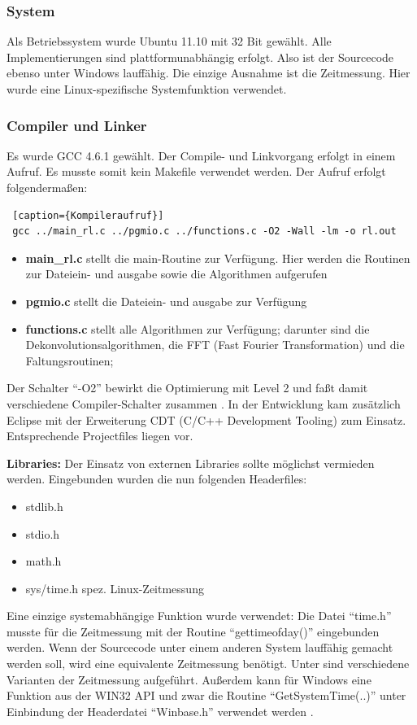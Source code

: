 \documentclass[a4paper,12pt]{article}
\begin{document}
\subsubsection{System}
Als Betriebssystem wurde Ubuntu 11.10 mit 32 Bit gewählt. Alle Implementierungen
sind plattformunabhängig erfolgt. Also ist der Sourcecode ebenso unter Windows
lauffähig. Die einzige Ausnahme ist die Zeitmessung. Hier wurde eine
Linux-spezifische Systemfunktion verwendet.
\subsubsection{Compiler und Linker}
Es wurde GCC 4.6.1 gewählt. Der Compile- und Linkvorgang erfolgt in einem
Aufruf. Es musste somit kein Makefile verwendet werden.
Der Aufruf erfolgt folgendermaßen:
\begin{lstlisting} [caption={Kompileraufruf}]
 gcc ../main_rl.c ../pgmio.c ../functions.c -O2 -Wall -lm -o rl.out
\end{lstlisting}
\begin{itemize}
  \itemsep -1pt  
\item \textbf{main\_rl.c} stellt die main-Routine zur Verfügung. Hier werden die
Routinen zur Dateiein- und ausgabe sowie die Algorithmen aufgerufen
\item \textbf{pgmio.c} stellt die Dateiein- und ausgabe zur Verfügung
\item \textbf{functions.c} stellt alle Algorithmen zur Verfügung; darunter sind
die Dekonvolutions\-algorithmen, die FFT (Fast Fourier Transformation) und die
Faltungsroutinen;
\end{itemize}
Der Schalter "`-O2"' bewirkt die Optimierung mit Level 2 und faßt damit
verschiedene Compiler-Schalter zusammen \cite{gcc}.
In der Entwicklung kam zusätzlich Eclipse mit der Erweiterung CDT (C/C++
Development Tooling) zum Einsatz. Entsprechende Projectfiles liegen vor.

\textbf{Libraries:} Der Einsatz von externen Libraries sollte
möglichst vermieden werden. Eingebunden wurden die nun folgenden Headerfiles:
\begin{itemize} 
  \itemsep -1pt 
  \item stdlib.h
  \item	stdio.h
  \item	math.h
  \item sys/time.h spez. Linux-Zeitmessung
\end{itemize}
Eine einzige systemabhängige Funktion wurde verwendet:
Die Datei "`time.h"' musste für die Zeitmessung mit der Routine
"`gettimeofday()"' eingebunden werden. Wenn der Sourcecode unter einem anderen
System lauffähig gemacht werden soll, wird eine equivalente
Zeitmessung benötigt. Unter \cite{fastcode} sind verschiedene Varianten der
Zeitmessung aufgeführt. 
Außerdem kann für Windows eine Funktion aus
der WIN32 API und zwar die Routine "`GetSystemTime(..)"' unter Einbindung der
Headerdatei "`Winbase.h"' verwendet werden \cite{petzold}.
\end{document}
